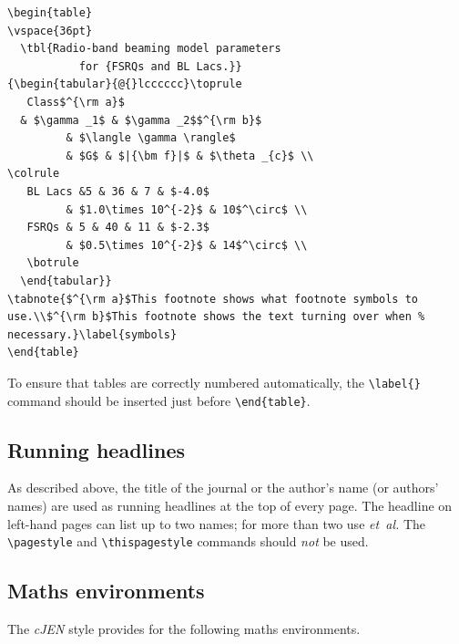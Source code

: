 \documentclass[]{cJEN2e}
\begin{document}
\begin{verbatim}
\begin{table}
\vspace{36pt}
  \tbl{Radio-band beaming model parameters
           for {FSRQs and BL Lacs.}}
{\begin{tabular}{@{}lcccccc}\toprule
   Class$^{\rm a}$
  & $\gamma _1$ & $\gamma _2$$^{\rm b}$
         & $\langle \gamma \rangle$
         & $G$ & $|{\bm f}|$ & $\theta _{c}$ \\
\colrule
   BL Lacs &5 & 36 & 7 & $-4.0$
         & $1.0\times 10^{-2}$ & 10$^\circ$ \\
   FSRQs & 5 & 40 & 11 & $-2.3$
         & $0.5\times 10^{-2}$ & 14$^\circ$ \\
   \botrule
  \end{tabular}}
\tabnote{$^{\rm a}$This footnote shows what footnote symbols to
use.\\$^{\rm b}$This footnote shows the text turning over when %
necessary.}\label{symbols}
\end{table}
\end{verbatim}

To ensure that tables are correctly numbered automatically, the
\verb"\label{}" command should be inserted just before
\verb"\end{table}".

\subsection{Running headlines}\label{markboth}

As described above, the title of the journal or the author's name (or authors' names) are used as running headlines at the top of every page. The headline on left-hand pages can list up to two names; for more than two use {\it et~al.} The \verb"\pagestyle" and \verb"\thispagestyle" commands should {\it not\/} be used.

\subsection{Maths environments}

The {\it cJEN} style provides for the following maths environments.
\end{document}
